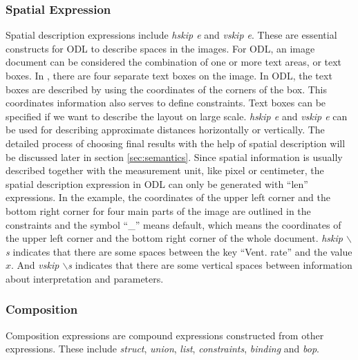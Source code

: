 \subsubsection{Spatial Expression}
Spatial description expressions include %
\textit{hskip e} and \textit{vskip e}.
These are essential constructs for ODL to describe spaces in the images.
For ODL, an image document can be considered the combination of
one or more text areas, or text boxes. In ,
there are four separate text boxes on the image.
In ODL, the text boxes are described by using the coordinates of
the corners of the box. This coordinates information also serves to define
constraints. Text boxes can be specified if we want
to describe the layout on large scale.
\textit{hskip e} and \textit{vskip e} can be used for describing
approximate distances horizontally or vertically.
The detailed process of choosing final results with the
help of spatial description will be discussed later
in section \ref{sec:semantics}.
Since spatial information is usually described together with the
measurement unit, like pixel or centimeter,
the spatial description expression in ODL can only
be generated with ``len'' expressions.
In the example, the coordinates of the upper left corner and
the bottom right corner for four main parts of the image are outlined in the
constraints and the symbol ``\_'' means default, which means the
coordinates of the upper left corner and the bottom right corner of the
whole document. \textit{hskip $\backslash$s} indicates that there are some spaces
between the key ``Vent. rate'' and the value $x$. And \textit{vskip $\backslash$s}
indicates that there are some vertical spaces between information about
interpretation and parameters.

\subsubsection{Composition}
Composition expressions are compound expressions constructed from other
expressions. These include
\textit{struct}, \textit{union}, \textit{list},
\textit{constraints}, \textit{binding} and \textit{bop}.


